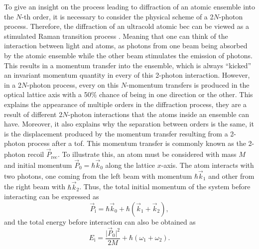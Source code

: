 To give an insight on the process leading to diffraction of an atomic ensemble into the $N$-th order, it is necessary to consider the physical scheme of a 2$N$-photon process. Therefore, the diffraction of an ultracold atomic \ac{bec} can be viewed as a stimulated Raman transition process \cite{Kozuma1999}. Meaning that one can think of the interaction between light and atoms, as photons from one beam being absorbed by the atomic ensemble while the other beam stimulates the emission of photons. This results in a momentum transfer into the ensemble, which is always ``kicked'' an invariant momentum quantity in every of this 2-photon interaction. However, in a 2$N$-photon process, every on this $N$-momentum transfers is produced in the optical lattice axis with a 50$\%$ chance of being in one direction or the other. This explains the appearance of multiple orders in the diffraction process, they are a result of different 2$N$-photon interactions that the atoms inside an ensemble can have. Moreover, it also explains why the separation between orders is the same, it is the displacement produced by the momentum transfer resulting from a 2-photon process after a \ac{tof}. This momentum transfer is commonly known as the 2-photon recoil $\vec{P}_\text{rec}$. To illustrate this, an atom must be considered with mass $M$ and initial momentum $\vec{P}_0 = \hbar \vec{k}_0$ along the lattice $x$-axis. The atom interacts with two photons, one coming from the left beam with momentum $\hbar \vec{k}_1$ and other from the right beam with $\hbar \vec{k}_2$. Thus, the total initial momentum of the system before interacting can be expressed as
\begin{equation}
	\vec{P}_\text{i} = \hbar \vec{k}_0 + \hbar (\vec{k}_1 + \vec{k}_2),
\end{equation}
and the total energy before interaction can also be obtained as
\begin{equation}\label{eq:bragg_energy_initial}
	E_\text{i} = \frac{\mathopen\big|\vec{P}_0\mathclose\big|^2}{2M} + \hbar (\omega_1 + \omega_2).
\end{equation}

